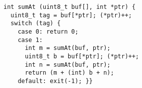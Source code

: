 \begin{lstlisting}
int sumAt (uint8_t buf[], int *ptr) {
  uint8_t tag = buf[*ptr]; (*ptr)++;
  switch (tag) {
    case 0: return 0;
    case 1:
      int m = sumAt(buf, ptr);
      uint8_t b = buf[*ptr]; (*ptr)++;
      int n = sumAt(buf, ptr);
      return (m + (int) b + n);
    default: exit(-1); }}
\end{lstlisting}
